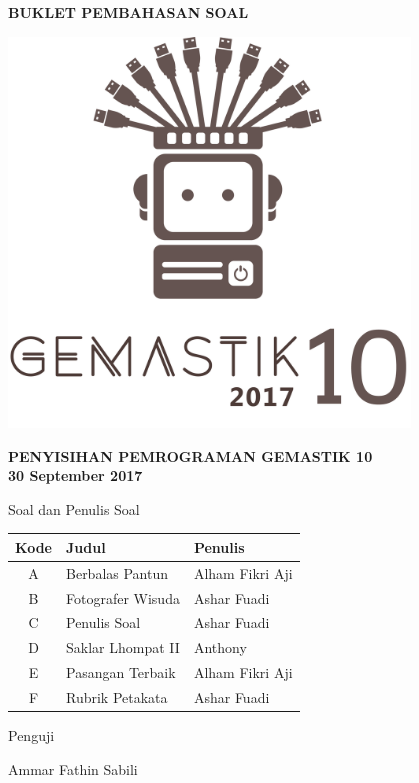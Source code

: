\documentclass[a4paper]{article}
\begin{document}
\begin{titlepage}
\begin{center}

    \textbf{\huge BUKLET PEMBAHASAN SOAL}
    
    \vspace{1cm} %
    
    \includegraphics[width=0.8\textwidth]{../gemastiklogo}
    
	\vspace{1cm} %
    
    \textbf{\LARGE PENYISIHAN PEMROGRAMAN GEMASTIK 10}\\[0.5cm]
    \textbf{\LARGE 30 September 2017}

	\vfill
	
	{\Large Soal dan Penulis Soal}
	
	\vspace{.1cm}
	
	\def\arraystretch{1.5} %
	\begin{tabular}{|c|l|l|}
		\hline
		\textbf{Kode} & \textbf{Judul} & \textbf{Penulis} \\
		\hline
		A & Berbalas Pantun & Alham Fikri Aji \\
		B & Fotografer Wisuda & Ashar Fuadi \\
		C & Penulis Soal & Ashar Fuadi \\
		D & Saklar Lhompat II & Anthony \\
		E & Pasangan Terbaik & Alham Fikri Aji \\
		F & Rubrik Petakata & Ashar Fuadi \\
		\hline
	\end{tabular}
	
	\vspace{.3cm}
	
	{\Large Penguji}
	
	Ammar Fathin Sabili

\end{center}
\end{titlepage}


\pagebreak

\pagebreak

\pagebreak

\pagebreak

\pagebreak

\end{document}
